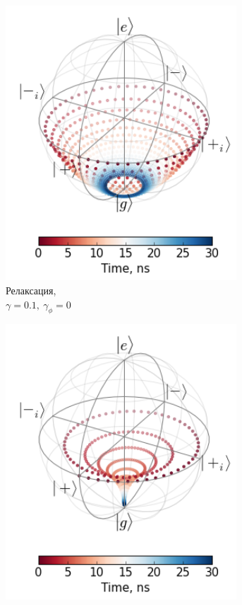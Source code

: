 \documentclass[12pt, twoside]{report}
\numberwithin{equation}{section}
\numberwithin{figure}{section}
\begin{document}
\begin{figure}[h]
\centering
\begin{subfigure}[t]{0.32\textwidth}
\centering
\includegraphics[width=0.95\textwidth]{Pictures/bloch_rel}
\caption{Релаксация,\\ $\gamma = 0.1,\ \gamma_\phi = 0$}
\end{subfigure}
\begin{subfigure}[t]{0.32\textwidth}
\centering
\includegraphics[width=0.95\textwidth]{Pictures/bloch_tot}

\end{subfigure}
\end{figure}
\end{document}

